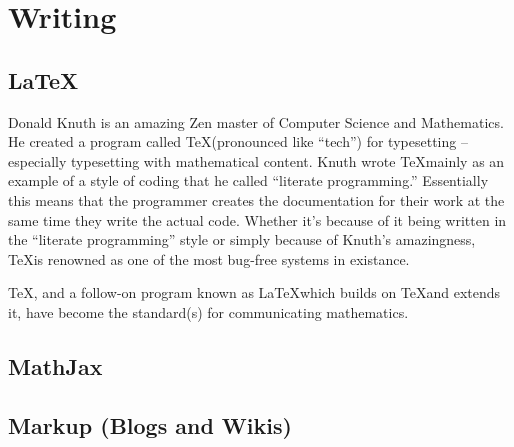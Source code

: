  
\chapter{Writing}


\section{LaTeX}
\label{sec:latex}

Donald Knuth is an amazing Zen master of Computer Science and Mathematics.  He created a program called \TeX (pronounced like ``tech'') for typesetting -- especially typesetting with mathematical content.  Knuth wrote \TeX mainly as an example of a style of coding that he called ``literate programming.''  Essentially this means that the programmer creates the documentation for their work at the same time they write the actual code.  Whether it's because of it being written in the ``literate programming'' style or simply because of Knuth's amazingness, \TeX is renowned as one of the most bug-free systems in existance. 

\TeX, and a follow-on program known as \LaTeX which builds on \TeX and extends it, have become the standard(s) for communicating mathematics.


\section{MathJax}
\label{sec:mathjax}

\section{Markup (Blogs and Wikis)}
\label{sec:markup}

